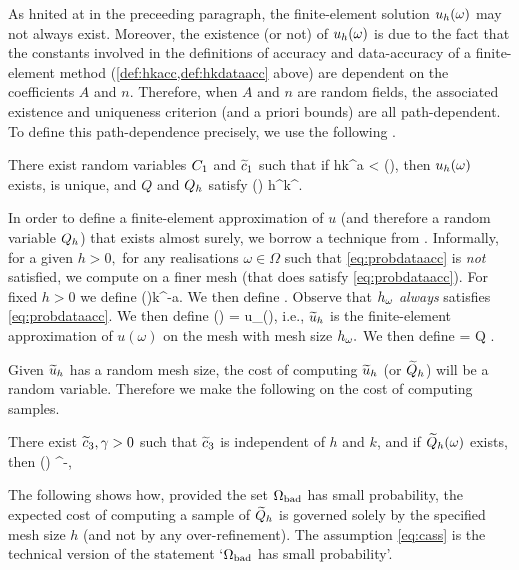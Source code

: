 As hnited at in the preceeding paragraph, the finite-element solution $u_{h}(\omega)$ may not always exist. Moreover, the existence (or not) of $u_{h}(\omega)$ is due to the fact that the constants involved in the definitions of accuracy and data-accuracy of a finite-element method (\cref{def:hkacc,def:hkdataacc} above) are dependent on the coefficients $A$ and $n$. Therefore, when $A$ and $n$ are random fields, the associated existence and uniqueness criterion (and a priori bounds) are all path-dependent. To define this path-dependence precisely, we use the following .

\label{def:probdataacc}
There exist random variables $C_{1}$ and $\widetilde{c}_{1}$ such that if
\beq\label{eq:probdataacc}
hk^a < \Co(\omega),
\eeq
then $u_{h}(\omega)$ exists, is unique, and $Q$ and $Q_{h}$ satisfy
\beqs
{} \leq \cotilde(\omega) h^\alpha k^\sigma \Cfg.
\eeqs
\eas

In order to define a finite-element approximation of $u$ (and therefore a random variable $Q_{h}$) that exists almost surely, we borrow a technique from \cite{GrPaSc:19}. Informally, for a given $h>0,$ for any realisations $\omega \in \Omega$ such that \cref{eq:probdataacc} is \emph{not} satisfied, we compute on a finer mesh (that does satisfy \cref{eq:probdataacc}). For fixed $h>0$ we define
\beq\label{eq:hmaxomega}
\hmaxomega \de \Co(\omega)k^{-a}.
\eeq
We then define
\beq\label{eq:homega}
\homega \de \min{}.
\eeq
Observe that $h_{\omega}$ \emph{always} satisfies \cref{eq:probdataacc}. We then define
\beqs
\uhtilde(\omega) = u_{\homega}(\omega),
\eeqs
i.e., $\widetilde{u}_{h}$ is the finite-element approximation of $u(\omega)$ on the mesh with mesh size $h_{\omega}.$ We then define
\beq\label{eq:Qhtilde}
\Qhtilde = Q \circ \uhtilde.
\eeq
{}

Given $\widetilde{u}_{h}$ has a random mesh size, the cost of computing $\widetilde{u}_{h}$ (or $\widetilde{Q}_{h}$) will be a random variable. Therefore we make the following  on the cost of computing samples.

\label{ass:costone}
There exist $\widetilde{c}_{3}, \gamma > 0$ such that $\widetilde{c}_{3}$ is independent of $h$ and $k$, and if $\widetilde{Q}_{h}(\omega)$ exists, then
\beqs
\Cost{\Qhtilde(\omega)} \leq \cthtilde(\omega) \homega^{-\gamma},
\eeqs
\eas

The following  shows how, provided the set $\Omega_{\mathrm{bad}}$ has small probability, the expected cost of computing a sample of $\widetilde{Q}_{h}$ is governed solely by the specified mesh size $h$ (and not by any over-refinement). The assumption \cref{eq:cass} is the technical version of the statement `$\Omega_{\mathrm{bad}}$ has small probability'.

